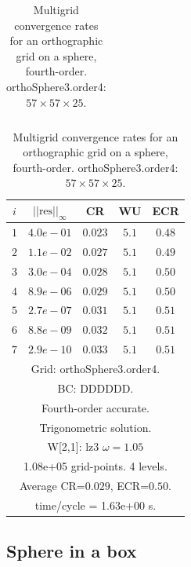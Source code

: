 \begin{table}[hbt]
\begin{center}
{\begin{tabular}{|c|c|c|c|c|}
\hline 
\end{tabular}
\begin{tabular}{|c|c|c|c|c|} \hline 
 $i$   & $\vert\vert\mbox{res}\vert\vert_\infty$  &  CR     &  WU    & ECR  \\   \hline 
 $ 1$  & $ 4.0e-01$ & $0.023$ & $ 5.1$ & $0.48$ \\ 
 $ 2$  & $ 1.1e-02$ & $0.027$ & $ 5.1$ & $0.49$ \\ 
 $ 3$  & $ 3.0e-04$ & $0.028$ & $ 5.1$ & $0.50$ \\ 
 $ 4$  & $ 8.9e-06$ & $0.029$ & $ 5.1$ & $0.50$ \\ 
 $ 5$  & $ 2.7e-07$ & $0.031$ & $ 5.1$ & $0.51$ \\ 
 $ 6$  & $ 8.8e-09$ & $0.032$ & $ 5.1$ & $0.51$ \\ 
 $ 7$  & $ 2.9e-10$ & $0.033$ & $ 5.1$ & $0.51$ \\ 
\hline 
\multicolumn{5}{|c|}{Grid: orthoSphere3.order4.}  \\
\multicolumn{5}{|c|}{BC: DDDDDD.}  \\
\multicolumn{5}{|c|}{Fourth-order accurate.}  \\
\multicolumn{5}{|c|}{Trigonometric solution.}  \\
\multicolumn{5}{|c|}{W[2,1]: lz3 $\omega=1.05$}  \\
\multicolumn{5}{|c|}{1.08e+05 grid-points. 4 levels.}  \\
\multicolumn{5}{|c|}{Average CR=$0.029$, ECR=$0.50$.}  \\
\multicolumn{5}{|c|}{time/cycle = 1.63e+00 s.}  \\
\hline 
\end{tabular}
} %
\end{center}
\caption{Multigrid convergence rates for an orthographic grid on a sphere, fourth-order.
   orthoSphere3.order4: $57\times 57\times 25$.}
\label{fig:orthoSphereOrder4}
\end{table}






\clearpage
\subsection{Sphere in a box}


